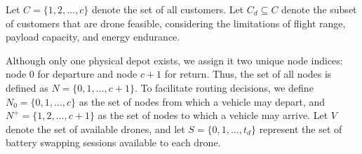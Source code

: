 \documentclass[3p, authoryear, 11pt]{elsarticle}
\begin{document}
Let $C = \{1, 2, \dots, c\}$ denote the set of all customers. Let $C_d \subseteq C$ denote the subset of customers that are drone feasible, considering the limitations of flight range, payload capacity, and energy endurance.

Although only one physical depot exists, we assign it two unique node indices: node $0$ for departure and node $c+1$ for return. Thus, the set of all nodes is defined as $N = \{0, 1, \dots, c+1\}$. To facilitate routing decisions, we define $N_0 = \{0, 1, \dots, c\}$ as the set of nodes from which a vehicle may depart, and $N^+ = \{1, 2, \dots, c+1\}$ as the set of nodes to which a vehicle may arrive. Let $V$ denote the set of available drones, and let $S = \{0, 1, \dots, t_d\}$ represent the set of battery swapping sessions available to each drone.




\end{document}
